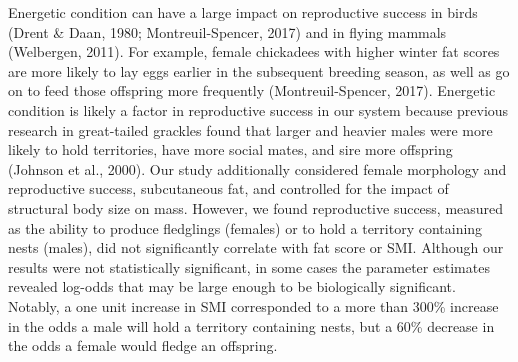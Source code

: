 \documentclass[
]{article}
\begin{document}
Energetic condition can have a large impact on reproductive success in
birds (Drent \& Daan, 1980; Montreuil-Spencer, 2017) and in flying
mammals (Welbergen, 2011). For example, female chickadees with higher
winter fat scores are more likely to lay eggs earlier in the subsequent
breeding season, as well as go on to feed those offspring more
frequently (Montreuil-Spencer, 2017). Energetic condition is likely a
factor in reproductive success in our system because previous research
in great-tailed grackles found that larger and heavier males were more
likely to hold territories, have more social mates, and sire more
offspring (Johnson et al., 2000). Our study additionally considered
female morphology and reproductive success, subcutaneous fat, and
controlled for the impact of structural body size on mass. However, we
found reproductive success, measured as the ability to produce
fledglings (females) or to hold a territory containing nests (males),
did not significantly correlate with fat score or SMI. Although our
results were not statistically significant, in some cases the parameter
estimates revealed log-odds that may be large enough to be biologically
significant. Notably, a one unit increase in SMI corresponded to a more
than 300\% increase in the odds a male will hold a territory containing
nests, but a 60\% decrease in the odds a female would fledge an
offspring.
\end{document}
